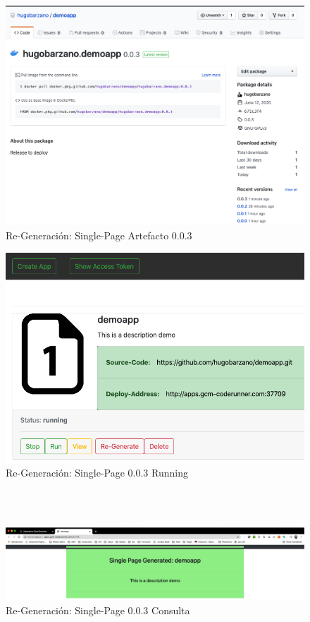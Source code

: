 \documentclass[a4paper,11pt]{book}
\begin{document}
   \begin{figure}[H]
\centering
\includegraphics[scale=0.3]{imagenes/casouso_a/4_7.png}
\caption{  Re-Generación: Single-Page Artefacto 0.0.3 }
\label{4_7}
\end{figure}


   \begin{figure}[H]
\centering
\includegraphics[scale=0.4]{imagenes/casouso_a/4_8.png}
\caption{  Re-Generación: Single-Page 0.0.3 Running }
\label{4_8}
\end{figure}

~\\
~\\

   \begin{figure}[H]
\centering
\includegraphics[scale=0.22]{imagenes/casouso_a/4_9.png}
\caption{ Re-Generación: Single-Page 0.0.3 Consulta  }
\label{4_9}
\end{figure}
\end{document}
